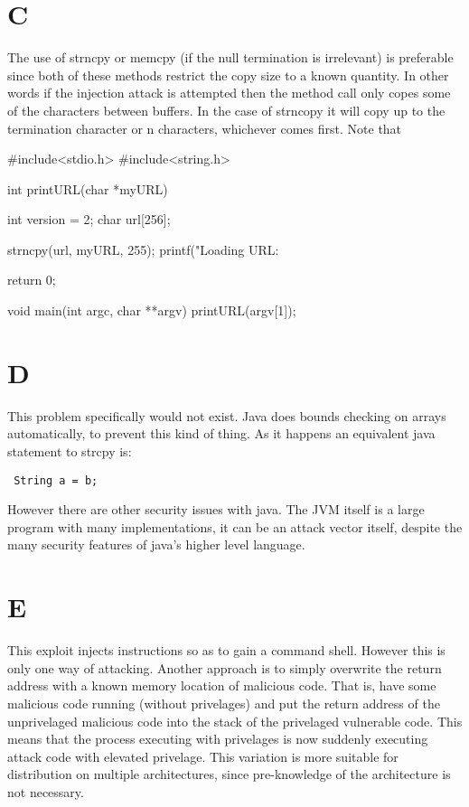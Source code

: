 \documentclass{article}
\begin{document}
\section*{C}
The use of strncpy or memcpy (if the null termination is irrelevant) is preferable since both of these methods restrict the copy size to a known quantity.
In other words if the injection attack is attempted then the method call only copes some of the characters between buffers.
In the case of strncopy it will copy up to the termination character or n characters, whichever comes first.
Note that 
\begin{verbatimtab}
#include<stdio.h>
#include<string.h>

int
printURL(char *myURL) {
	int version = 2;
	char url[256];
	
	strncpy(url, myURL, 255);
	printf("Loading URL: %
	
	return 0;
}

void
main(int argc, char **argv) {
	printURL(argv[1]);
}
\end{verbatimtab}

\section*{D}
This problem specifically would not exist.
Java does bounds checking on arrays automatically, to prevent this kind of thing.
As it happens an equivalent java statement to strcpy is:
\begin{verbatim} String a = b; \end{verbatim}

However there are other security issues with java.
The JVM itself is a large program with many implementations, it can be an attack vector itself, despite the many security features of java's higher level language.

\section*{E}

This exploit injects instructions so as to gain a command shell.
However this is only one way of attacking.
Another approach is to simply overwrite the return address with a known memory location of malicious code.
That is, have some malicious code running (without privelages) and put the return address of the unprivelaged malicious code into the stack of the privelaged vulnerable code.
This means that the process executing with privelages is now suddenly executing attack code with elevated privelage.
This variation is more suitable for distribution on multiple architectures, since pre-knowledge of the architecture is not necessary.
\end{document}
